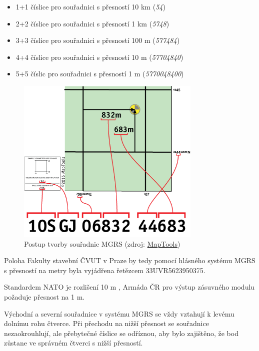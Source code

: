 \begin{itemize}
		\begin{itemize}
				\item 1+1 číslice pro souřadnici s přesností 10 km (\textit{54})
				\item 2+2 číslice pro souřadnici s přesností 1 km (\textit{5748})
				\item 3+3 číslice pro souřadnici s přesností 100 m (\textit{577484})
				\item 4+4 číslice pro souřadnici s přesností 10 m (\textit{57704840})
				\item 5+5 číslic pro souřadnici s přesností 1 m (\textit{5770048400})
		\end{itemize}	
		 
\end{itemize}

\begin{figure}[H]
    \centering
      \includegraphics[width=250pt]{./pictures/MGRS_tvorba.png}
      \caption[Postup tvorby souřadnic MGRS]{Postup tvorby souřadnic MGRS
      (zdroj: \href{https://www.maptools.com/tutorials/mgrs/quick_guide}{MapTools})}
      \label{fig:maptools}
\end{figure}
  
Poloha Fakulty stavební ČVUT v Praze by tedy pomocí hlásného systému
MGRS s přesností na metry byla vyjádřena řetězcem 33UVR5623950375.

Standardem NATO je rozlišení 10 m \cite{wiki}, Armáda ČR pro výstup
zásuvného modulu požaduje přesnost na 1 m.

Východní a severní souřadnice v systému MGRS se vždy vztahují k levému
dolnímu rohu čtverce. Při přechodu na nižší přesnost se souřadnice
nezaokrouhlují, ale přebytečné číslice se odříznou, aby bylo
zajištěno, že bod zůstane ve správném čtverci s nižší přesností.

